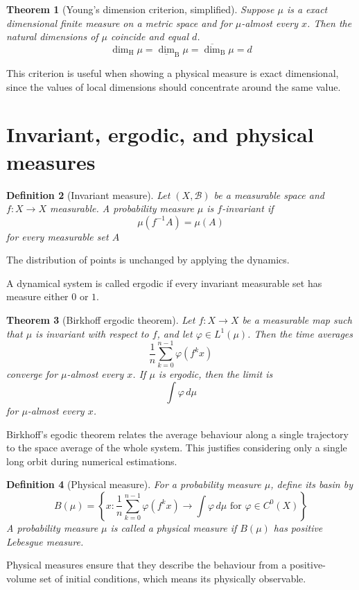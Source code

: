 \documentclass[11pt,a4paper]{article}
\newtheorem{theorem}{Theorem}[section]
\newtheorem{definition}[theorem]{Definition}
\newcommand{\dimH}{\dim_{\mathrm H}}
\begin{document}
\begin{theorem}[Young's dimension criterion, simplified]
	Suppose \(\mu\) is a \emph{exact dimensional} finite measure on a metric space and
	for \(\mu\)-almost every \(x\). Then the natural dimensions of \(\mu\) coincide and equal \(d\).
	\[
		\dimH \mu = \underline{\dim}_{\mathrm B} \mu = \overline{\dim}_{\mathrm B} \mu = d
	\]
\end{theorem}

This criterion is useful when showing a physical measure is exact dimensional, since the values of local dimensions should concentrate around the same value.

\section{Invariant, ergodic, and physical measures}

\begin{definition}[Invariant measure]
	Let \((X,\mathcal{B})\) be a measurable space and \(f:X\to X\) measurable. A probability measure \(\mu\) is \(f\)-invariant if
	\[
		\mu(f^{-1}A)=\mu(A)
	\]
	for every measurable set \(A\)
\end{definition}

\noindent The distribution of points is unchanged by applying the dynamics.

A dynamical system is called ergodic if every invariant measurable set has measure either \(0\) or \(1\). %

\begin{theorem}[Birkhoff ergodic theorem]
	Let \(f:X\to X\) be a measurable map such that \(\mu\) is invariant with respect to \(f\), and let \(\varphi\in L^1(\mu)\). Then the time averages
	\[
		\frac1n\sum_{k=0}^{n-1}\varphi(f^k x)
	\]
	converge for \(\mu\)-almost every \(x\). If \(\mu\) is ergodic, then the limit is
	\[
		\int \varphi\,d\mu
	\]
	for \(\mu\)-almost every \(x\).
\end{theorem}
Birkhoff's egodic theorem relates the average behaviour along a single trajectory to the space average of the whole system. This justifies considering only a single long orbit during numerical estimations.

\begin{definition}[Physical measure]
	For a probability measure \(\mu\), define its basin by
	\[
		B(\mu)=\left\{x : \frac{1}{n}\sum_{k=0}^{n-1}\varphi(f^k x)
		\to \int \varphi\, d\mu
		\text{ for } \varphi \in C^0(X) \right\} %
	\]
	A probability measure \(\mu\) is called a physical measure if \(B(\mu)\) has positive Lebesgue measure.
\end{definition}
\noindent Physical measures ensure that they describe the behaviour from a positive-volume set of initial conditions, which means its physically observable.
\end{document}
